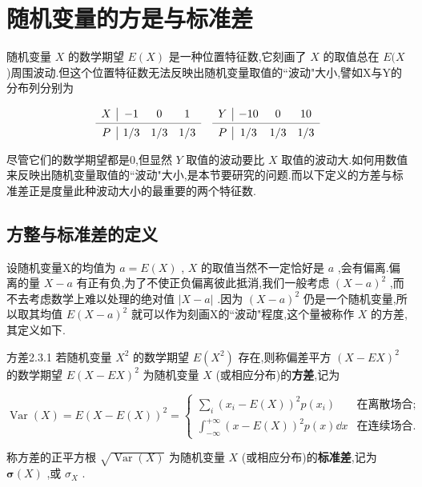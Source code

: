 \section{随机变量的方是与标准差}\label{sec:2.3}


随机变量 $ X $ 的数学期望 $ E(X) $ 是一种位置特征数,它刻画了 $ X $ 的取值总在 $ E(X $ )周围波动.但这个位置特征数无法反映出随机变量取值的``波动"大小,譬如X与Y的分布列分别为

\[
\begin{array}{c|ccccc|ccc}
X     & -1    & 0     & 1     &       & Y     & -10   & 0     & 10 \\
\cmidrule{1-4}\cmidrule{6-9}    P     & 1/3   & 1/3   & 1/3   &       & P     & 1/3   & 1/3   & 1/3 \\
\end{array}\]

尽管它们的数学期望都是0,但显然 $ Y $ 取值的波动要比 $ X $ 取值的波动大.如何用数值来反映出随机变量取值的``波动"大小,是本节要研究的问题.而以下定义的方差与标准差正是度量此种波动大小的最重要的两个特征数.

\subsection{方整与标准差的定义}\label{2.3.1}

设随机变量X的均值为 $ a=E(X) $ , $ X $ 的取值当然不一定恰好是 $ a $ ,会有偏离.偏离的量 $ X-a $ 有正有负,为了不使正负偏离彼此抵消,我们一般考虑 $ (X-a)^2 $ ,而不去考虑数学上难以处理的绝对值 $ |X-a| $ .因为 $ (X-a)^2 $ 仍是一个随机变量,所以取其均值 $ E(X-a)^2 $ 就可以作为刻画X的``波动"程度,这个量被称作 $ X $ 的方差,其定义如下.
\begin{definition}{方差}{2.3.1}
	若随机变量 $ X^2 $ 的数学期望 $ E(X^2) $ 存在,则称偏差平方 $ (X-EX)^2 $ 的数学期望 $ E(X-EX)^2 $ 为随机变量 $ X $ (或相应分布)的\textbf{方差},记为
	
	\begin{equation}
	\operatorname{Var}(X)=E(X-E(X))^{2}=\left\{\begin{array}{ll}
	{\sum_{i}\left(x_{i}-E(X)\right)^{2} p\left(x_{i}\right)} &{\text{在离散场合;}}\\
	{\int_{-\infty}^{+\infty}(x-E(X))^{2} p(x) \dd x} &{\text{在连续场合.}}
	\end{array}\right. \label{eq:2.3.1}
	\end{equation}
	
	称方差的正平方根 $ \sqrt{\operatorname{Var}(X)} $ 为随机变量 $ X $ (或相应分布)的\textbf{标准差},记为 $ \boldsymbol{\sigma}(X) $ ,或 $ \sigma_X $ .
\end{definition}



